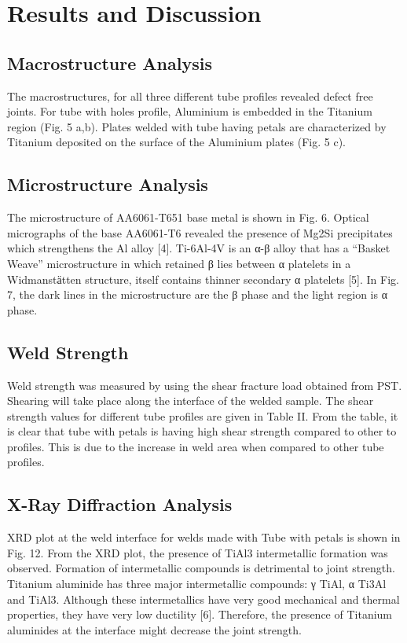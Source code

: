 \documentclass[preprint]{elsarticle}
\begin{document}
\section{Results and Discussion}
\label{sec:Results and Discussion}

\subsection{Macrostructure Analysis}
\label{subsec:Macrostructure Analysis}
The macrostructures, for all three different tube profiles revealed defect free joints. For tube with holes profile, Aluminium is embedded in the Titanium region (Fig. 5 a,b). Plates welded with tube having petals are characterized by Titanium deposited on the surface of the Aluminium plates (Fig. 5 c).

\subsection{Microstructure Analysis}
\label{subsec:Macrostructure Analysis}
The microstructure of AA6061-T651 base metal is shown in Fig. 6. Optical micrographs of the base AA6061-T6 revealed the presence of Mg2Si precipitates which strengthens the Al alloy [4]. Ti-6Al-4V is an α-β alloy that has a “Basket Weave” microstructure in which retained β lies between α platelets in a Widmanstӓtten structure, itself contains thinner secondary α platelets [5]. In Fig. 7, the dark lines in the microstructure are
the β phase and the light region is α phase.

\subsection{Weld Strength}
\label{subsec:Weld Strength}
Weld strength was measured by using the shear fracture load obtained from PST. Shearing will take place along the interface of the welded sample. The shear strength values for different tube profiles are given in Table II. From the table, it is clear that tube with petals is having high shear strength compared to other to profiles. This is due to the increase in weld area when compared to other tube profiles.

\subsection{X-Ray Diffraction Analysis}
\label{subsec:XRD-Results}
XRD plot at the weld interface for welds made with Tube with petals is shown in Fig. 12. From the XRD plot, the
presence of TiAl3 intermetallic formation was observed. Formation of intermetallic compounds is detrimental to joint strength. Titanium aluminide has three major intermetallic compounds: γ TiAl, α Ti3Al and TiAl3. Although these intermetallics have very good mechanical and thermal properties, they have very low ductility [6]. Therefore, the presence of Titanium aluminides at the interface might decrease the joint strength.
\end{document}
